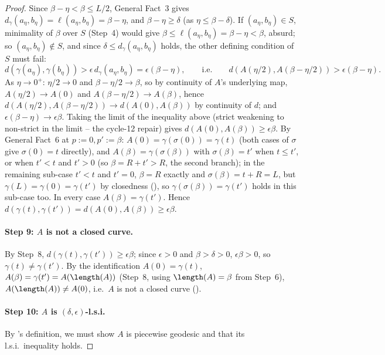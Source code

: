 \begin{proof}
  Since $\beta-\eta < \beta \le L/2$, General Fact~3 gives $d_\gamma(a_\eta,b_\eta) =
  \ell(a_\eta,b_\eta) = \beta-\eta$, and $\beta-\eta \ge \delta$ (as $\eta\le\beta-\delta$). If
  $(a_\eta,b_\eta)\in S$, minimality of $\beta$ over $S$ (Step~4) would give $\beta \le
  \ell(a_\eta,b_\eta) = \beta-\eta < \beta$, absurd; so $(a_\eta,b_\eta)\notin S$, and since $\delta
  \le d_\gamma(a_\eta,b_\eta)$ holds, the other defining condition of $S$ must fail:
  \[
    d(\gamma(a_\eta),\gamma(b_\eta)) > \epsilon\, d_\gamma(a_\eta,b_\eta) = \epsilon(\beta-\eta)
    ,\qquad\text{i.e.}\qquad
    d(A(\eta/2),A(\beta-\eta/2)) > \epsilon(\beta-\eta)
    .
  \]
  As $\eta \to 0^+$: $\eta/2 \to 0$ and $\beta-\eta/2 \to \beta$, so by continuity of $A$'s
  underlying map, $A(\eta/2) \to A(0)$ and $A(\beta-\eta/2)\to A(\beta)$, hence
  $d(A(\eta/2),A(\beta-\eta/2)) \to d(A(0),A(\beta))$ by continuity of $d$; and $\epsilon(\beta-\eta)
  \to \epsilon\beta$. Taking the limit of the inequality above (strict weakening to non-strict in
  the limit -- the cycle-12 repair) gives $d(A(0),A(\beta)) \ge \epsilon\beta$. By General Fact~6 at
  $p:=0,p':=\beta$: $A(0)=\gamma(\sigma(0))=\gamma(t)$ (both cases of $\sigma$ give $\sigma(0)=t$
  directly), and $A(\beta) = \gamma(\sigma(\beta))$ with $\sigma(\beta)=t'$ when $t\le t'$, or when
  $t'<t$ and $t'>0$ (so $\beta=R+t'>R$, the second branch); in the remaining sub-case $t'<t$ and
  $t'=0$, $\beta=R$ exactly and $\sigma(\beta)=t+R=L$, but $\gamma(L)=\gamma(0)=\gamma(t')$ by
  closedness (), so $\gamma(\sigma(\beta))=\gamma(t')$ holds in this
  sub-case too. In every case $A(\beta)=\gamma(t')$. Hence $d(\gamma(t),\gamma(t')) =
  d(A(0),A(\beta)) \ge \epsilon\beta$.

  \paragraph{Step 9: $A$ is not a closed curve.} By Step~8, $d(\gamma(t),\gamma(t')) \ge \epsilon
  \beta$; since $\epsilon>0$ and $\beta>\delta>0$, $\epsilon\beta>0$, so $\gamma(t) \ne \gamma(t')$.
  By the identification $A(0)=\gamma(t)$, $A(\beta)=\gamma(t')=A(\length(A))$ (Step~8, using
  $\length(A)=\beta$ from Step~6), $A(\length(A)) \ne A(0)$, i.e.\ $A$ is not a closed curve
  ().

  \paragraph{Step 10: $A$ is $(\delta,\epsilon)$-l.s.i.} By 's definition, we must
  show $A$ is piecewise geodesic and that its l.s.i.\ inequality holds.


\end{proof}
